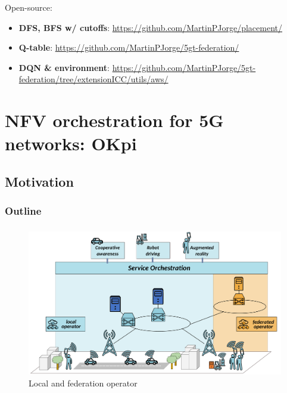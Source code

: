 \documentclass[aspectratio=169]{beamer}
\begin{document}
\begin{frame}
    \frametitle{\secname}
    \framesubtitle{\subsecname}
    Open-source:
    \begin{itemize}
        \item \textbf{DFS, BFS w/ cutoffs}: \url{https://github.com/MartinPJorge/placement/}
        \item \textbf{Q-table}: \url{https://github.com/MartinPJorge/5gt-federation/}
        \item \textbf{DQN \& environment}: \url{https://github.com/MartinPJorge/5gt-federation/tree/extensionICC/utils/aws/}
    \end{itemize}
\end{frame}







\section{NFV orchestration for 5G networks: OKpi}
\subsection{Motivation}
\begin{frame}
    \frametitle{Outline}
    \tableofcontents[subsectionstyle=show/shaded/hide,sectionstyle=show/shaded]
\end{frame}


\begin{frame}
    \frametitle{\secname}
    \framesubtitle{\subsecname}
    \begin{figure}
        \centering
        \includegraphics[width=.8\textwidth]{img/big-picture-federation.pdf}
        \caption{Local and federation operator}
    \end{figure}
\end{frame}
\end{document}
